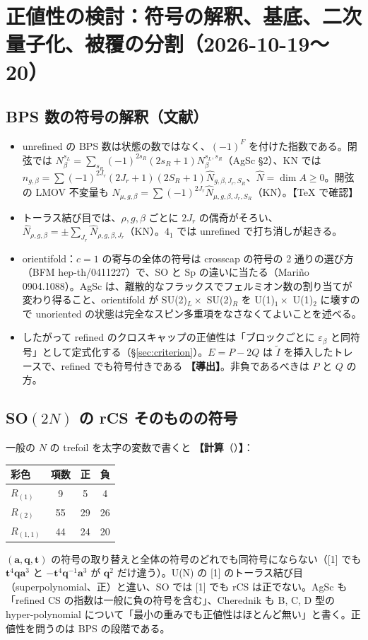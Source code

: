 \documentclass[a4paper,10pt]{ltjsarticle}
\newcommand{\ba}{\bm{a}}
\newcommand{\bq}{\bm{q}}
\newcommand{\bt}{\bm{t}}
\newcommand{\deriv}{\textbf{【導出】}}
\newcommand{\comp}[1]{\textbf{【計算}\if\relax\detokenize{#1}\relax\else（#1）\fi\textbf{】}}
\begin{document}
\section{正値性の検討：符号の解釈、基底、二次量子化、被覆の分割（2026-10-19〜20）}\label{sec:positivity}
\subsection{BPS 数の符号の解釈（文献）}
\begin{itemize}
\item unrefined の BPS 数は状態の数ではなく、$(-1)^F$ を付けた指数である。閉弦では $N^{s_L}_\beta = \sum_{s_R}(-1)^{2s_R}(2s_R+1)N^{s_L,s_R}_\beta$（AgSc §2）、KN では $n_{g,\beta} = \sum(-1)^{2J_r}(2J_r+1)(2S_R+1)\hat N_{g,\beta,J_r,S_R}$、$\hat N = \dim A \ge 0$。開弦の LMOV 不変量も $\hat N_{\mu,g,\beta} = \sum(-1)^{2J_r}\hat N_{\mu,g,\beta,J_r,S_R}$（KN）。【TeX で確認】
\item トーラス結び目では、$\rho, g, \beta$ ごとに $2J_r$ の偶奇がそろい、$\hat N_{\rho,g,\beta} = \pm\sum_{J_r}\hat N_{\rho,g,\beta,J_r}$（KN）。$4_1$ では unrefined で打ち消しが起きる。
\item orientifold：$c = 1$ の寄与の全体の符号は crosscap の符号の 2 通りの選び方（BFM hep-th/0411227）で、SO と Sp の違いに当たる（Mariño 0904.1088）。AgSc は、離散的なフラックスでフェルミオン数の割り当てが変わり得ること、orientifold が SU(2)$_L \times$ SU(2)$_R$ を U(1)$_1 \times$ U(1)$_2$ に壊すので unoriented の状態は完全なスピン多重項をなさなくてよいことを述べる。
\item したがって refined のクロスキャップの正値性は「ブロックごとに $\varepsilon_\beta$ と同符号」として定式化する（§\ref{sec:criterion}）。$E = P - 2Q$ は $\tilde I$ を挿入したトレースで、refined でも符号付きである \deriv。非負であるべきは $P$ と $Q$ の方。
\end{itemize}

\subsection{SO$(2N)$ の rCS そのものの符号}
一般の $N$ の trefoil を太字の変数で書くと \comp{}：
\begin{center}
\begin{tabular}{lccc}
\toprule
彩色 & 項数 & 正 & 負 \\
\midrule
$R_{(1)}$ & 9 & 5 & 4 \\
$R_{(2)}$ & 55 & 29 & 26 \\
$R_{(1,1)}$ & 44 & 24 & 20 \\
\bottomrule
\end{tabular}
\end{center}
$(\ba, \bq, \bt)$ の符号の取り替えと全体の符号のどれでも同符号にならない（[1] でも $\bt^4\bq\ba^3$ と $-\bt^4\bq^{-1}\ba^3$ が $\bq^2$ だけ違う）。U(N) の [1] のトーラス結び目（superpolynomial、正）と違い、SO では [1] でも rCS は正でない。AgSc も「refined CS の指数は一般に負の符号を含む」、Cherednik も B, C, D 型の hyper-polynomial について「最小の重みでも正値性はほとんど無い」と書く。正値性を問うのは BPS の段階である。
\end{document}
